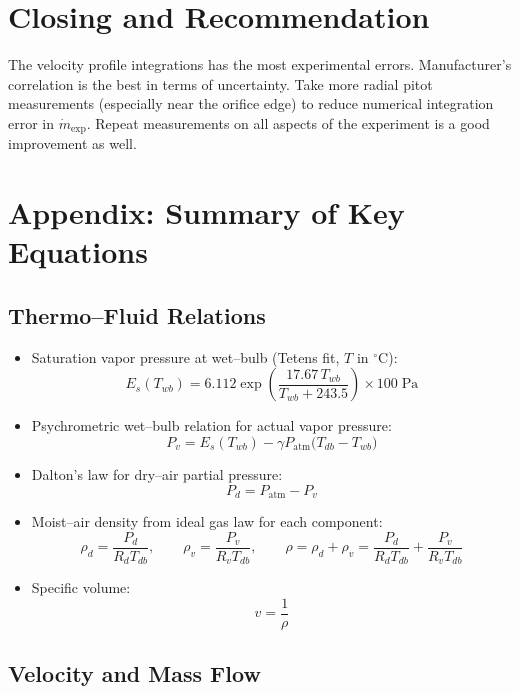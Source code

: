 \documentclass[11pt]{article}
\begin{document}
\section*{Closing and Recommendation}

The velocity profile integrations has the most experimental errors. Manufacturer's correlation is the best in terms of uncertainty.
Take more radial pitot measurements (especially near the orifice edge)
to reduce numerical integration error in \( \dot m_{\text{exp}} \). Repeat measurements on all aspects of the experiment is a good improvement as well.



\newpage
\appendix
\section*{Appendix: Summary of Key Equations}

\subsection*{Thermo–Fluid Relations}

\begin{itemize}
  \item Saturation vapor pressure at wet–bulb (Tetens fit, \(T\) in \(^\circ\text{C}\)):
    $$
      E_s(T_{wb}) =
      6.112 \exp\!\left(
        \frac{17.67\,T_{wb}}{T_{wb} + 243.5}
      \right)\times 100
      \;\text{Pa}
    $$
  \item Psychrometric wet–bulb relation for actual vapor pressure:
    $$
      P_v = E_s(T_{wb})
            - \gamma P_{\text{atm}}
              \bigl(T_{db} - T_{wb}\bigr)
    $$
  \item Dalton's law for dry–air partial pressure:
    $$
      P_d = P_{\text{atm}} - P_v
    $$
  \item Moist–air density from ideal gas law for each component:
    $$
      \rho_d = \frac{P_d}{R_d T_{db}},
      \qquad
      \rho_v = \frac{P_v}{R_v T_{db}},
      \qquad
      \rho = \rho_d + \rho_v
      = \frac{P_d}{R_d T_{db}} + \frac{P_v}{R_v T_{db}}
    $$
  \item Specific volume:
    $$
      v = \frac{1}{\rho}
    $$
\end{itemize}

\subsection*{Velocity and Mass Flow}
\end{document}

